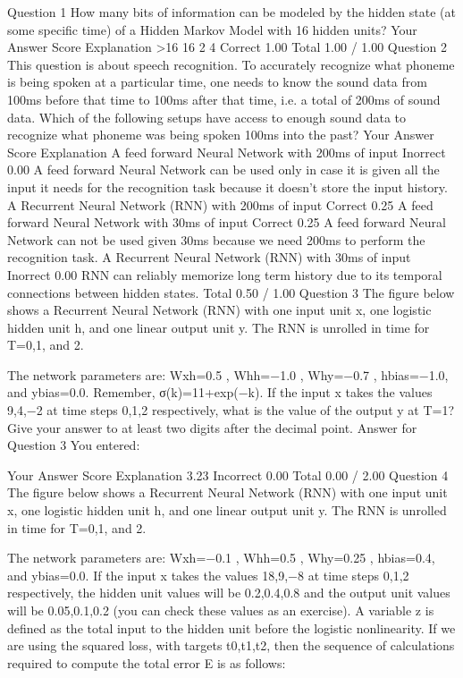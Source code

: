 Question 1
How many bits of information can be modeled by the hidden state (at some specific time) of a Hidden Markov Model with 16 hidden units?
Your Answer		Score	Explanation
>16			
16			
2			
4	Correct	1.00	
Total		1.00 / 1.00	
Question 2
This question is about speech recognition. To accurately recognize what phoneme is being spoken at a particular time, one needs to know the sound data from 100ms before that time to 100ms after that time, i.e. a total of 200ms of sound data. Which of the following setups have access to enough sound data to recognize what phoneme was being spoken 100ms into the past?
Your Answer		Score	Explanation
A feed forward Neural Network with 200ms of input	Inorrect	0.00	A feed forward Neural Network can be used only in case it is given all the input it needs for the recognition task because it doesn't store the input history.
A Recurrent Neural Network (RNN) with 200ms of input	Correct	0.25	
A feed forward Neural Network with 30ms of input	Correct	0.25	A feed forward Neural Network can not be used given 30ms because we need 200ms to perform the recognition task.
A Recurrent Neural Network (RNN) with 30ms of input	Inorrect	0.00	RNN can reliably memorize long term history due to its temporal connections between hidden states.
Total		0.50 / 1.00	
Question 3
The figure below shows a Recurrent Neural Network (RNN) with one input unit x, one logistic hidden unit h, and one linear output unit y. The RNN is unrolled in time for T=0,1, and 2. 



The network parameters are: Wxh=0.5 , Whh=−1.0 , Why=−0.7 , hbias=−1.0, and ybias=0.0. Remember, σ(k)=11+exp(−k). 
If the input x takes the values 9,4,−2 at time steps 0,1,2 respectively, what is the value of the output y at T=1? Give your answer to at least two digits after the decimal point.
Answer for Question 3
You entered:

Your Answer		Score	Explanation
3.23	Incorrect	0.00	
Total		0.00 / 2.00	
Question 4
The figure below shows a Recurrent Neural Network (RNN) with one input unit x, one logistic hidden unit h, and one linear output unit y. The RNN is unrolled in time for T=0,1, and 2. 



The network parameters are: Wxh=−0.1 , Whh=0.5 , Why=0.25 , hbias=0.4, and ybias=0.0. 
If the input x takes the values 18,9,−8 at time steps 0,1,2 respectively, the hidden unit values will be 0.2,0.4,0.8 and the output unit values will be 0.05,0.1,0.2 (you can check these values as an exercise). A variable z is defined as the total input to the hidden unit before the logistic nonlinearity.
If we are using the squared loss, with targets t0,t1,t2, then the sequence of calculations required to compute the total error E is as follows:

